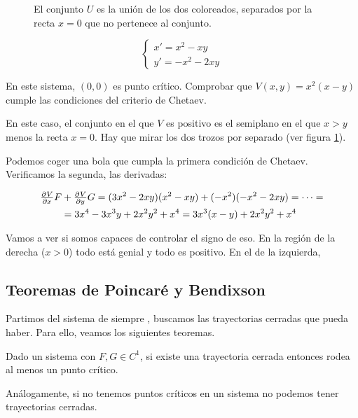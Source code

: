 \begin{example}

\begin{figure}
\label{img8-Ej6}
\caption{El conjunto $U$ es la unión de los dos coloreados, separados por la recta $x=0$ que no pertenece al conjunto.}
\end{figure}

\[ \begin{cases}
x' = x^2 - xy \\ y' = -x^2 -2xy
\end{cases}\]

En este sistema, $(0,0)$ es punto crítico. Comprobar que $V(x,y) = x^2(x-y)$ cumple las condiciones del criterio de Chetaev.

En este caso, el conjunto en el que $V$ es positivo es el semiplano en el que $x > y$ menos la recta $x=0$. Hay que mirar los dos trozos por separado (ver figura \ref{img8-Ej6}).

Podemos coger una bola que cumpla la primera condición de Chetaev. Verificamos la segunda, las derivadas:

\begin{multline*}
 \pd{V}{x} F + \pd{V}{y}G = (3x^2-2xy)(x^2-xy) + (-x^2)(-x^2-2xy) = \dotsb = \\ =  3x^4-3x^3y+2x^2y^2+x^4 = 3x^3(x-y) + 2x^2y^2+x^4 \end{multline*}

Vamos a ver si somos capaces de controlar el signo de eso. En la región de la derecha ($x>0$) todo está genial y todo es positivo. En el de la izquierda,
\end{example}

\subsection{Teoremas de Poincaré y Bendixson}

Partimos del sistema de siempre , buscamos las trayectorias cerradas que pueda haber. Para ello, veamos los siguientes teoremas.

\begin{theorem}[de Poincaré] Dado un sistema  con $F,G∈C^1$, si existe una trayectoria cerrada entonces rodea al menos un punto crítico.

Análogamente, si no tenemos puntos críticos en un sistema no podemos tener trayectorias cerradas.
\end{theorem}

